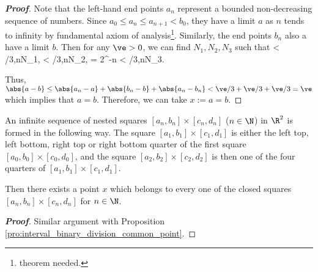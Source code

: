 \begin{proof}[\bf Proof]
Note that the left-hand end points $a_n$ represent a bounded non-decreasing sequence of numbers. Since $a_0\leq a_n\leq a_{n+1} < b_0$, they have a limit $a$ as $n$ tends to infinity by fundamental axiom of analysis\footnote{theorem needed.}. Similarly, the end points $b_n$ also a have a limit $b$. Then for any $\ve>0$, we can find $N_1,N_2,N_3$ such that
\be
{} < \ve/3,\quad\forall n\geq N_1,\qquad {} < \ve/3,\quad\forall n\geq N_2,\qquad {} = 2^{-n} < \ve/3,\quad\forall n\geq N_3.
\ee

Thus, $\abs{a-b} \leq \abs{a_n -a} + \abs{b_n -b} + \abs{a_n -b_n} < \ve/3+ \ve/3+\ve/3 = \ve$ which implies that $a= b$. Therefore, we can take $x := a= b$.
\end{proof}

\begin{proposition}\label{pro:square_binary_division_common_point}
An infinite sequence of nested squares $[a_n,b_n]\times [c_n,d_n]$ ($n\in \N$) in $\R^2$ is formed in the following way. The square $[a_1,b_1]\times [c_1,d_1]$ is either the left top, left bottom, right top or right bottom quarter of the first square $[a_0,b_0]\times[c_0,d_0]$, and the square $[a_2,b_2]\times [c_2,d_2]$ is then one of the four quarters of $[a_1,b_1]\times [c_1,d_1]$.

Then there exists a point $x$ which belongs to every one of the closed squares $[a_n,b_n]\times [c_n,d_n]$ for $n\in \N$.
\end{proposition}

\begin{proof}[\bf Proof]
Similar argument with Proposition \ref{pro:interval_binary_division_common_point}.
\end{proof}

%
%




